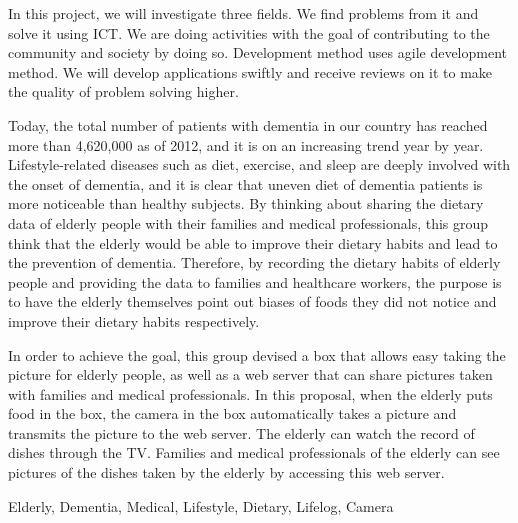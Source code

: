 \documentclass[../report]{subfiles}
\begin{document}
\begin{eabstract}
In this project, we will investigate three fields.
We find problems from it and solve it using ICT.
We are doing activities with the goal of contributing to the community and society by doing so.
Development method uses agile development method.
We will develop applications swiftly and receive reviews on it to make the quality of problem solving higher.

Today, the total number of patients with dementia in our country has reached more than 4,620,000 as of 2012, and it is on an increasing trend year by year.
Lifestyle-related diseases such as diet, exercise, and sleep are deeply involved with the onset of dementia, and it is clear that uneven diet of dementia patients is more noticeable than healthy subjects.
By thinking about sharing the dietary data of elderly people with their families and medical professionals, this group think that the elderly would be able to improve their dietary habits and lead to the prevention of dementia.
Therefore, by recording the dietary habits of elderly people and providing the data to families and healthcare workers, the purpose is to have the elderly themselves point out biases of foods they did not notice and improve their dietary habits respectively.

In order to achieve the goal, this group devised a box that allows easy taking the picture for elderly people, as well as a web server that can share pictures taken with families and medical professionals.
In this proposal, when the elderly puts food in the box, the camera in the box automatically takes a picture and transmits the picture to the web server.
The elderly can watch the record of dishes through the TV.
Families and medical professionals of the elderly can see pictures of the dishes taken by the elderly by accessing this web server.
\begin{ekeyword}
Elderly, Dementia, Medical, Lifestyle, Dietary, Lifelog, Camera
\end{ekeyword}
\end{eabstract}
\end{document}
